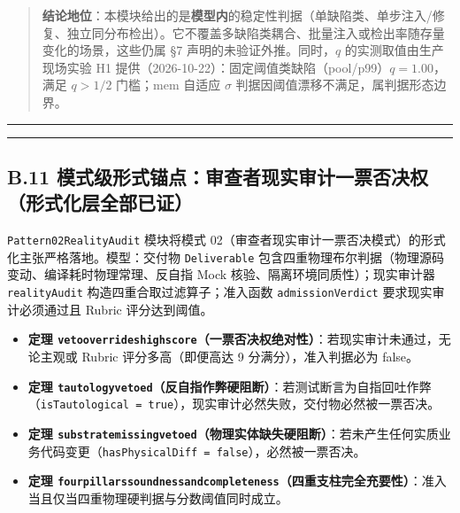 \documentclass[
]{ctexart}
\providecommand{\tightlist}{%
  \setlength{\itemsep}{0pt}\setlength{\parskip}{0pt}}
\renewcommand{\_}{\discretionary{}{}{\textunderscore}}
\begin{document}
\begin{quote}
\textbf{结论地位}：本模块给出的是\textbf{模型内}的稳定性判据（单缺陷类、单步注入/修复、独立同分布检出）。它不覆盖多缺陷类耦合、批量注入或检出率随存量变化的场景，这些仍属
§7 声明的未验证外推。同时，\(q\) 的实测取值由生产现场实验 H1
提供（2026-10-22）：固定阈值类缺陷（pool/p99）\(q=1.00\)，满足 \(q>1/2\)
门槛；mem 自适应 \(\sigma\) 判据因阈值漂移不满足，属判据形态边界。
\end{quote}

\begin{center}\rule{0.5\linewidth}{0.5pt}\end{center}

\begin{center}\rule{0.5\linewidth}{0.5pt}\end{center}

\subsection{B.11
模式级形式锚点：审查者现实审计一票否决权（形式化层全部已证）}\label{b.11-ux6a21ux5f0fux7ea7ux5f62ux5f0fux951aux70b9ux5ba1ux67e5ux8005ux73b0ux5b9eux5ba1ux8ba1ux4e00ux7968ux5426ux51b3ux6743ux5f62ux5f0fux5316ux5c42ux5168ux90e8ux5df2ux8bc1}

\texttt{Pattern02\_RealityAudit} 模块将模式
02（审查者现实审计一票否决模式）的形式化主张严格落地。模型：交付物
\texttt{Deliverable}
包含四重物理布尔判据（物理源码变动、编译耗时物理常理、反自指 Mock
核验、隔离环境同质性）；现实审计器 \texttt{realityAudit}
构造四重合取过滤算子；准入函数 \texttt{admissionVerdict}
要求现实审计必须通过且 Rubric 评分达到阈值。

\begin{itemize}
\tightlist
\item
  \textbf{定理
  \texttt{veto\_overrides\_high\_score}（一票否决权绝对性）}：若现实审计未通过，无论主观或
  Rubric 评分多高（即便高达 9 分满分），准入判据必为 false。
\item
  \textbf{定理
  \texttt{tautology\_vetoed}（反自指作弊硬阻断）}：若测试断言为自指回吐作弊（\texttt{isTautological\ =\ true}），现实审计必然失败，交付物必然被一票否决。
\item
  \textbf{定理
  \texttt{substrate\_missing\_vetoed}（物理实体缺失硬阻断）}：若未产生任何实质业务代码变更（\texttt{hasPhysicalDiff\ =\ false}），必然被一票否决。
\item
  \textbf{定理
  \texttt{four\_pillars\_soundness\_and\_completeness}（四重支柱完全充要性）}：准入当且仅当四重物理硬判据与分数阈值同时成立。
\end{itemize}
\end{document}
